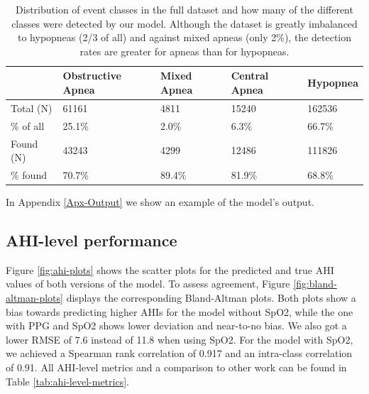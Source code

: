 \renewcommand{\arraystretch}{1.5}
\begin{table}
    \centering
    \begin{tabular}{ l p{2cm} p{2cm} p{2cm} p{2cm} }
        & Obstructive \newline Apnea & Mixed \newline Apnea & Central \newline Apnea & Hypopnea \\
        \hline
        Total (N) & 61161 & 4811 & 15240 & 162536 \\
        \% of all & 25.1\% & 2.0\% & 6.3\%  &  66.7\% \\
        \hline
        Found (N) & 43243 & 4299 & 12486 & 111826 \\
        \% found & 70.7\% & 89.4\% & 81.9\% & 68.8\% \\
    \end{tabular}
    \caption{Distribution of event classes in the full dataset and how many of the different classes were detected by our model. Although the dataset is greatly imbalanced to hypopneas (2/3 of all) and against mixed apneas (only 2\%), the detection rates are greater for apneas than for hypopneas. \label{tab:event-class-distribution}}
\end{table}

In Appendix \ref{Apx-Output} we show an example of the model's output.

\subsection*{AHI-level performance}

Figure \ref{fig:ahi-plots} shows the scatter plots for the predicted and true AHI values of both versions of the model. To assess agreement, Figure \ref{fig:bland-altman-plots} displays the corresponding Bland-Altman plots. Both plots show a bias towards predicting higher AHIs for the model without SpO2, while the one with PPG and SpO2 shows lower deviation and near-to-no bias. We also got a lower RMSE of 7.6 instead of 11.8 when using SpO2.
For the model with SpO2, we achieved a Spearman rank correlation of 0.917 and an intra-class correlation of  0.91.
All AHI-level metrics and a comparison to other work can be found in Table \ref{tab:ahi-level-metrics}.

